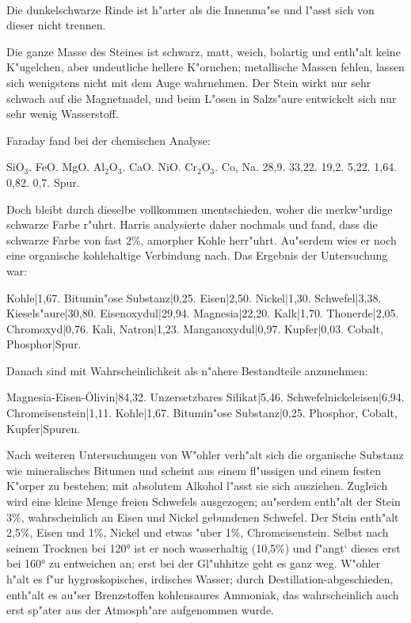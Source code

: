 \documentclass[a4paper, 11pt, oneside]{article}
\begin{document}
\paragraph{}
Die dunkelschwarze Rinde ist h"arter als die Innenma"se und l"asst sich von dieser nicht trennen.

Die ganze Masse des Steines ist schwarz, matt, weich, bolartig und enth"alt keine K"ugelchen, aber undeutliche hellere K"ornchen; metallische Massen fehlen, lassen sich wenigstens nicht mit dem Auge wahrnehmen. Der Stein wirkt nur sehr schwach auf die Magnetnadel, und beim L"osen in Salzs"aure entwickelt sich nur sehr wenig Wasserstoff.

Faraday fand bei der chemischen Analyse:

SiO$_{3}$. FeO. MgO. Al$_{2}$O$_{3}$. CaO. NiO. Cr$_{2}$O$_{3}$. Co, Na.  
28,9. 33,22. 19,2. 5,22. 1,64. 0,82. 0,7. Spur.

Doch bleibt durch dieselbe vollkommen unentschieden, woher die merkw"urdige schwarze Farbe r"uhrt. Harris analysierte daher nochmals und fand, dass die schwarze Farbe von fast 2\%, amorpher Kohle herr"uhrt. Au"serdem wies er noch eine organische kohlehaltige Verbindung nach. Das Ergebnis der Untersuchung war:

Kohle|1,67.  
Bitumin"ose Substanz|0,25.  
Eisen|2,50.  
Nickel|1,30.  
Schwefel|3,38.  
Kiesels"aure|30,80.  
Eisenoxydul|29,94.  
Magnesia|22,20.  
Kalk|1,70.  
Thonerde|2,05.  
Chromoxyd|0,76.  
Kali, Natron|1,23.  
Manganoxydul|0,97.  
Kupfer|0,03.  
Cobalt, Phosphor|Spur.

Danach sind mit Wahrscheinlichkeit als n"ahere Bestandteile anzunehmen:

Magnesia-Eisen-Ölivin|84,32.  
Unzersetzbares Silikat|5,46.  
Schwefelnickeleisen|6,94.  
Chromeisenstein|1,11.  
Kohle|1,67.  
Bitumin"ose Substanz|0,25.  
Phosphor, Cobalt, Kupfer|Spuren.

Nach weiteren Untersuchungen von W"ohler verh"alt sich die organische Substanz wie mineralisches Bitumen und scheint aus einem fl"ussigen und einem festen K"orper zu bestehen; mit absolutem Alkohol l"asst sie sich ausziehen. Zugleich wird eine kleine Menge freien Schwefels ausgezogen; au"serdem enth"alt der Stein 3\%, wahrscheinlich an Eisen und Nickel gebundenen Schwefel. Der Stein enth"alt 2,5\%, Eisen und 1\%, Nickel und etwas "uber 1\%, Chromeisenstein. Selbst nach seinem Trocknen bei 120° ist er noch wasserhaltig (10,5\%) und f"angt‘ dieses erst bei 160° zu entweichen an; erst bei der Gl"uhhitze geht es ganz weg. W"ohler h"alt es f"ur hygroskopisches, irdisches Wasser; durch Destillation-abgeschieden‚ enth"alt es au"ser Brenzstoffen kohlensaures Ammoniak, das wahrscheinlich auch erst sp"ater aus der Atmosph"are aufgenommen wurde.
\end{document}
